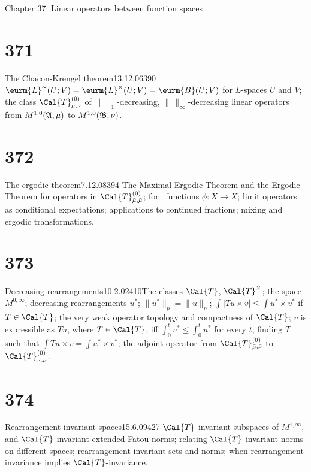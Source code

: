      
 Chapter 37:  Linear operators between function spaces
     
     
\section{371}{The Chacon-Krengel theorem}{13.12.06}{390}{}
{$\eurm{L}^{\sim}(U;V)=\eurm{L}^{\times}(U;V)=\eurm{B}(U;V)$ for
$L$-spaces
$U$ and $V$;  the class $\Cal{T}^{(0)}_{\bar\mu,\bar\nu}$ of
$\|\,\|_1$-decreasing, $\|\,\|_{\infty}$-decreasing linear operators
from $M^{1,0}(\frak{A},\bar\mu)$ to $M^{1,0}(\frak{B},\bar\nu)$.}
     
\section{372}{The ergodic theorem}{7.12.08}{394}{}
{The Maximal Ergodic Theorem and the Ergodic Theorem for operators
in $\Cal{T}^{(0)}_{\bar\mu,\bar\mu}$;  for \imp\ functions
$\phi:X{\to}X$;
limit operators as conditional expectations;  applications to continued
fractions;  mixing and ergodic transformations.}
     
\section{373}{Decreasing rearrangements}{10.2.02}{410}{}{The classes
$\Cal{T}$, $\Cal{T}^{\times}$;  the space
$M^{0,\infty}$;  decreasing rearrangements $u^*$;  $\|u^*\|_p=\|u\|_p$;
$\int|Tu{\times}v|\le{\int}u^*{\times}v^*$ if $T\in\Cal{T}$;  the very
weak
operator topology and compactness of $\Cal{T}$;  $v$ is expressible as
$Tu$, where $T\in\Cal{T}$, iff $\int_0^tv^*\le\int_0^tu^*$ for every
$t$;   finding $T$ such that ${\int}Tu{\times}v={\int}u^*{\times}v^*$;
the adjoint operator from $\Cal{T}^{(0)}_{\bar\mu,\bar\nu}$ to
$\Cal{T}^{(0)}_{\bar\nu,\bar\mu}$.}
     
\section{374}{Rearrangement-invariant spaces}{15.6.09}{427}{}
{$\Cal{T}$-invariant subspaces of $M^{1,\infty}$, and
$\Cal{T}$-invariant extended Fatou norms;  relating $\Cal{T}$-invariant
norms on different spaces;  rearrangement-invariant sets and norms;
when rearrangement-invariance implies $\Cal{T}$-invariance.}
     
